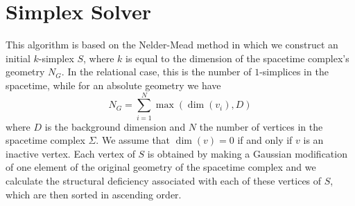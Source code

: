 \documentclass[12pt,letterpaper]{report}
\begin{document}
\section{Simplex Solver}

This algorithm is based on the Nelder-Mead method in which we construct an initial $k$-simplex $S$, 
where $k$ is equal to the dimension of the spacetime complex's geometry $N_G$. In the relational case, 
this is the number of $1$-simplices in the spacetime, while for an absolute geometry we have
\begin{equation*}
N_G = \sum_{i=1}^N \max(\dim(v_i),D)
\end{equation*}
where $D$ is the background dimension and $N$ the number of vertices in the spacetime complex $\Sigma$. 
We assume that $\dim(v)=0$ if and only if $v$ is an inactive vertex. Each vertex of $S$ is obtained by 
making a Gaussian modification of one element of the original geometry of the spacetime complex and we 
calculate the structural deficiency associated with each of these vertices of $S$, which are then sorted 
in ascending order.   
\end{document}
